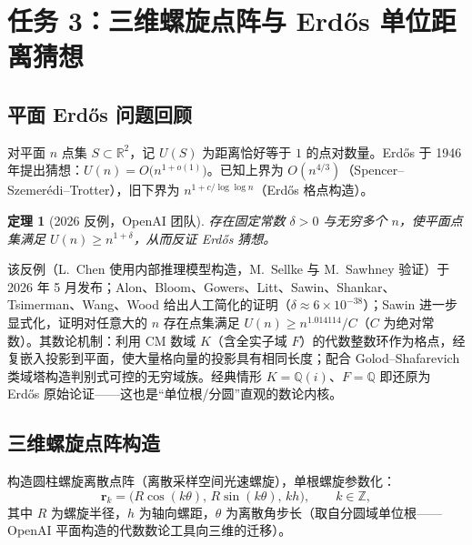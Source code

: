 \documentclass[11pt,a4paper]{article}
\newcommand{\R}{\mathbb{R}}
\newcommand{\br}{\bm{r}}
\newtheorem{theorem}{定理}[section]
\theoremstyle{remark}
\begin{document}
\section{任务 3：三维螺旋点阵与 Erd\H{o}s 单位距离猜想}

\subsection{平面 Erd\H{o}s 问题回顾}

对平面 $n$ 点集 $S\subset\R^{2}$，记 $U(S)$ 为距离恰好等于 $1$ 的点对数量。Erd\H{o}s 于 1946 年提出猜想：$U(n)=O\bigl(n^{1+o(1)}\bigr)$。已知上界为 $O(n^{4/3})$（Spencer--Szemer\'edi--Trotter），旧下界为 $n^{1+c/\log\log n}$（Erd\H{o}s 格点构造）。

\begin{theorem}[2026 反例，OpenAI 团队]
存在固定常数 $\delta>0$ 与无穷多个 $n$，使平面点集满足 $U(n)\ge n^{1+\delta}$，从而反证 Erd\H{o}s 猜想。
\end{theorem}

该反例（L.~Chen 使用内部推理模型构造，M.~Sellke 与 M.~Sawhney 验证）于 2026 年 5 月发布；Alon、Bloom、Gowers、Litt、Sawin、Shankar、Tsimerman、Wang、Wood 给出人工简化的证明（$\delta\approx6\times10^{-38}$）；Sawin 进一步显式化，证明对任意大的 $n$ 存在点集满足 $U(n)\ge n^{1.014114}/C$（$C$ 为绝对常数）。其数论机制：利用 CM 数域 $K$（含全实子域 $F$）的代数整数环作为格点，经复嵌入投影到平面，使大量格向量的投影具有相同长度；配合 Golod--Shafarevich 类域塔构造判别式可控的无穷域族。经典情形 $K=\mathbb{Q}(i)$、$F=\mathbb{Q}$ 即还原为 Erd\H{o}s 原始论证——这也是“单位根/分圆”直观的数论内核。

\subsection{三维螺旋点阵构造}

构造圆柱螺旋离散点阵（离散采样空间光速螺旋），单根螺旋参数化：
\begin{equation}
\label{eq:helix}
\br_{k}=\bigl(R\cos(k\theta),\,R\sin(k\theta),\,kh\bigr),\qquad k\in\mathbb{Z},
\end{equation}
其中 $R$ 为螺旋半径，$h$ 为轴向螺距，$\theta$ 为离散角步长（取自分圆域单位根——OpenAI 平面构造的代数数论工具向三维的迁移）。
\end{document}
